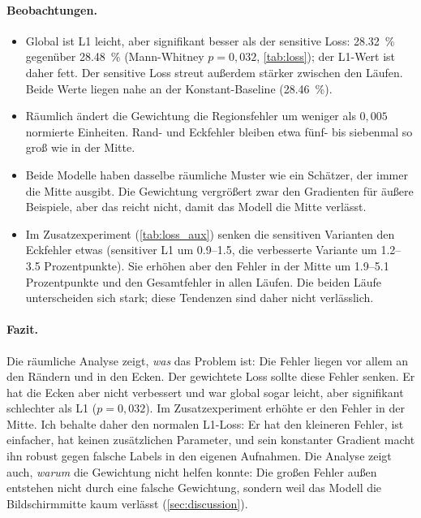 \paragraph{Beobachtungen.}
\begin{itemize}[nosep]
  \item Global ist L1 leicht, aber signifikant besser als der sensitive
        Loss: \SI{28,32}{\percent} gegenüber \SI{28,48}{\percent}
        (Mann-Whitney $p=0,032$, \cref{tab:loss}); der L1-Wert ist daher fett.
        Der sensitive Loss streut außerdem stärker zwischen den Läufen.
        Beide Werte liegen nahe an der Konstant-Baseline
        (\SI{28,46}{\percent}).
  \item Räumlich ändert die Gewichtung die Regionsfehler um weniger als
        $0,005$ normierte Einheiten. Rand- und Eckfehler bleiben etwa fünf- bis
        siebenmal so groß wie in der Mitte.
  \item Beide Modelle haben dasselbe räumliche Muster wie ein Schätzer, der
        immer die Mitte ausgibt. Die Gewichtung vergrößert zwar den Gradienten
        für äußere Beispiele, aber das reicht nicht, damit das Modell die Mitte
        verlässt.
  \item Im Zusatzexperiment (\cref{tab:loss_aux}) senken die sensitiven
        Varianten den Eckfehler etwas (sensitiver L1 um
        \num{0,9}--\num{1,5}, die verbesserte Variante um
        \num{1,2}--\num{3,5} Prozentpunkte). Sie erhöhen aber den Fehler in
        der Mitte um \num{1,9}--\num{5,1} Prozentpunkte und den Gesamtfehler in
        allen Läufen. Die beiden Läufe unterscheiden sich stark; diese Tendenzen
        sind daher nicht verlässlich.
\end{itemize}

\paragraph{Fazit.}
Die räumliche Analyse zeigt, \emph{was} das Problem ist: Die Fehler liegen vor
allem an den Rändern und in den Ecken. Der gewichtete Loss sollte diese
Fehler senken. Er hat die Ecken aber nicht verbessert und war global sogar
leicht, aber signifikant schlechter als L1 ($p=0,032$). Im Zusatzexperiment
erhöhte er den Fehler in der Mitte. Ich behalte daher den normalen
L1-Loss: Er hat den kleineren Fehler, ist einfacher, hat keinen
zusätzlichen Parameter, und sein konstanter Gradient macht ihn robust gegen
falsche Labels in den eigenen Aufnahmen. Die Analyse zeigt auch, \emph{warum}
die Gewichtung nicht helfen konnte: Die großen Fehler außen entstehen nicht
durch eine falsche Gewichtung, sondern weil das Modell die Bildschirmmitte
kaum verlässt (\cref{sec:discussion}).


